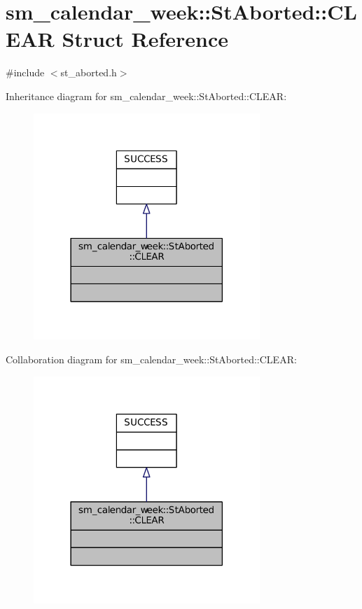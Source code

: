 \hypertarget{structsm__calendar__week_1_1StAborted_1_1CLEAR}{}\section{sm\+\_\+calendar\+\_\+week\+:\+:St\+Aborted\+:\+:C\+L\+E\+AR Struct Reference}
\label{structsm__calendar__week_1_1StAborted_1_1CLEAR}


{\ttfamily \#include $<$st\+\_\+aborted.\+h$>$}



Inheritance diagram for sm\+\_\+calendar\+\_\+week\+:\+:St\+Aborted\+:\+:C\+L\+E\+AR\+:
\nopagebreak
\begin{figure}[H]
\begin{center}
\leavevmode
\includegraphics[width=242pt]{structsm__calendar__week_1_1StAborted_1_1CLEAR__inherit__graph}
\end{center}
\end{figure}


Collaboration diagram for sm\+\_\+calendar\+\_\+week\+:\+:St\+Aborted\+:\+:C\+L\+E\+AR\+:
\nopagebreak
\begin{figure}[H]
\begin{center}
\leavevmode
\includegraphics[width=242pt]{structsm__calendar__week_1_1StAborted_1_1CLEAR__coll__graph}
\end{center}
\end{figure}


